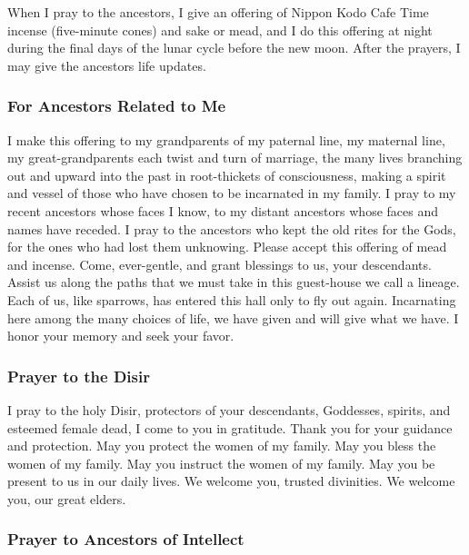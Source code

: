 \documentclass[
]{book}
\begin{document}
When I pray to the ancestors, I give an offering of Nippon Kodo Cafe Time incense (five-minute cones) and sake or mead, and I do this offering at night during the final days of the lunar cycle before the new moon. After the prayers, I may give the ancestors life updates.

\hypertarget{for-ancestors-related-to-me}{%
\subsubsection{For Ancestors Related to Me}\label{for-ancestors-related-to-me}}

I make this offering to
my grandparents of my paternal line,
my maternal line, my great-grandparents
each twist and turn of marriage,
the many lives branching out and upward
into the past in root-thickets of consciousness,
making a spirit and vessel of those who have chosen
to be incarnated in my family.
I pray to my recent ancestors whose faces I know,
to my distant ancestors whose faces and names have receded.
I pray to the ancestors who kept the old rites for the Gods,
for the ones who had lost them unknowing.
Please accept this offering of mead and incense.
Come, ever-gentle, and grant blessings to us, your descendants.
Assist us along the paths that we must take
in this guest-house we call a lineage.
Each of us, like sparrows, has entered this hall only to fly out again.
Incarnating here among the many choices of life,
we have given and will give what we have.
I honor your memory and seek your favor.

\hypertarget{prayer-to-the-disir}{%
\subsubsection{Prayer to the Disir}\label{prayer-to-the-disir}}

I pray to the holy Disir,
protectors of your descendants,
Goddesses, spirits, and esteemed female dead,
I come to you in gratitude.
Thank you for your guidance and protection.
May you protect the women of my family.
May you bless the women of my family.
May you instruct the women of my family.
May you be present to us in our daily lives.
We welcome you, trusted divinities.
We welcome you, our great elders.

\hypertarget{prayer-to-ancestors-of-intellect}{%
\subsubsection{Prayer to Ancestors of Intellect}\label{prayer-to-ancestors-of-intellect}}
\end{document}

